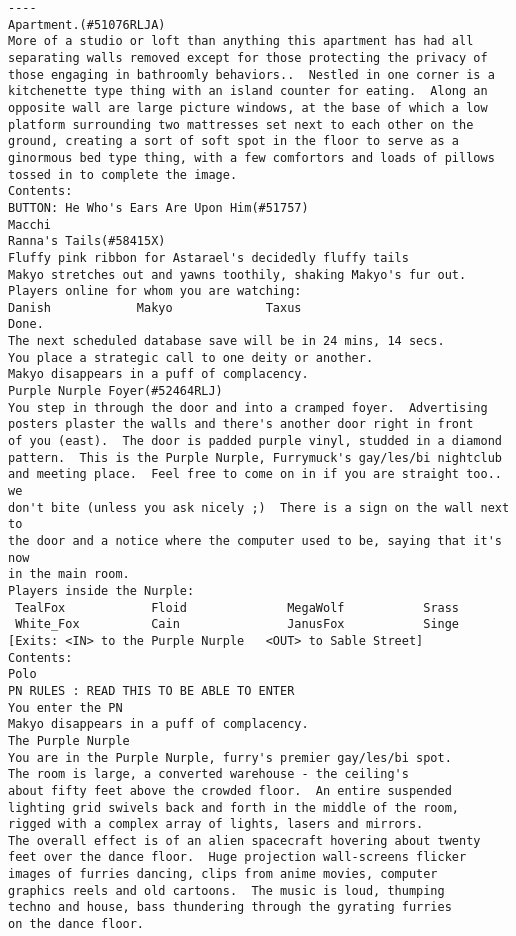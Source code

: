 \begin{verbatim}
----
Apartment.(#51076RLJA)
More of a studio or loft than anything this apartment has had all separating walls removed except for those protecting the privacy of those engaging in bathroomly behaviors..  Nestled in one corner is a kitchenette type thing with an island counter for eating.  Along an opposite wall are large picture windows, at the base of which a low platform surrounding two mattresses set next to each other on the ground, creating a sort of soft spot in the floor to serve as a ginormous bed type thing, with a few comfortors and loads of pillows tossed in to complete the image.
Contents:
BUTTON: He Who's Ears Are Upon Him(#51757)
Macchi
Ranna's Tails(#58415X)
Fluffy pink ribbon for Astarael's decidedly fluffy tails
Makyo stretches out and yawns toothily, shaking Makyo's fur out.
Players online for whom you are watching:
Danish            Makyo             Taxus             
Done.
The next scheduled database save will be in 24 mins, 14 secs.
You place a strategic call to one deity or another.
Makyo disappears in a puff of complacency.
Purple Nurple Foyer(#52464RLJ)
You step in through the door and into a cramped foyer.  Advertising
posters plaster the walls and there's another door right in front
of you (east).  The door is padded purple vinyl, studded in a diamond
pattern.  This is the Purple Nurple, Furrymuck's gay/les/bi nightclub
and meeting place.  Feel free to come on in if you are straight too.. we
don't bite (unless you ask nicely ;)  There is a sign on the wall next to
the door and a notice where the computer used to be, saying that it's now
in the main room.
Players inside the Nurple:
 TealFox            Floid              MegaWolf           Srass
 White_Fox          Cain               JanusFox           Singe
[Exits: <IN> to the Purple Nurple   <OUT> to Sable Street]
Contents:
Polo
PN RULES : READ THIS TO BE ABLE TO ENTER
You enter the PN
Makyo disappears in a puff of complacency.
The Purple Nurple
You are in the Purple Nurple, furry's premier gay/les/bi spot.  
The room is large, a converted warehouse - the ceiling's
about fifty feet above the crowded floor.  An entire suspended
lighting grid swivels back and forth in the middle of the room,
rigged with a complex array of lights, lasers and mirrors.  
The overall effect is of an alien spacecraft hovering about twenty
feet over the dance floor.  Huge projection wall-screens flicker
images of furries dancing, clips from anime movies, computer
graphics reels and old cartoons.  The music is loud, thumping
techno and house, bass thundering through the gyrating furries
on the dance floor.

\end{verbatim}
